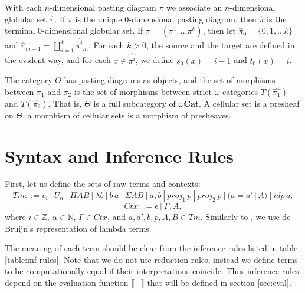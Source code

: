 \documentclass{amsart}
\theoremstyle{definition}
\theoremstyle{remark}
\newcommand{\cat}[1]{\mathbf{#1}}
\newcommand{\nats}{\mathbb{N}}
\newcommand{\Z}{\mathbb{Z}}
\newcommand{\ocat}{\omega \cat{Cat}}
\numberwithin{table}{section}
\begin{document}
With each $n$-dimensional pasting diagram $\pi$ we associate an $n$-dimensional globular set $\widehat{\pi}$.
If $\pi$ is the unique $0$-dimensional pasting diagram, then $\widehat{\pi}$ is the terminal $0$-dimensional globular set.
If $\pi = (\pi^1, \ldots \pi^k)$, then let $\widehat{\pi}_0 = \{0, 1, \ldots k\}$
and $\widehat{\pi}_{m+1} = \coprod \limits_{i = 1}^k \widehat{\pi^i}_m$.
For each $k > 0$, the source and the target are defined in the evident way,
and for each $x \in \widehat{\pi^i}$, we define $s_0(x) = i - 1$ and $t_0(x) = i$.

\begin{defn}
The category $\Theta$ has pasting diagrams as objects, and the set of morphisms between $\pi_1$ and $\pi_2$
is the set of morphisms between strict $\omega$-categories $T(\widehat{\pi_1})$ and $T(\widehat{\pi_2})$.
That is, $\Theta$ is a full subcategory of $\ocat$.
A cellular set is a presheaf on $\Theta$, a morphism of cellular sets is a morphism of presheaves.
\end{defn}

\section{Syntax and Inference Rules}

First, let us define the sets of raw terms and contexts:
\[ Tm ::= v_i\ |\ U_\alpha\ |\ \Pi A B\ |\ \lambda b\ |\ b\,a\ |\ \Sigma A B\ |\ a , b\ |\ proj_1\,p\ |\ proj_2\,p\ |\ (a = a'\,|\,A)\ |\ idp\,a, \]
\[ Ctx ::= \epsilon\ |\ \Gamma, A, \]
where $i \in \Z$, $\alpha \in \nats$, $\Gamma \in Ctx$, and $a, a', b, p, A, B \in Tm$.
Similarly to \cite{norm}, we use de Bruijn's representation of lambda terms.

The meaning of each term should be clear from the inference rules listed in table \ref{table:inf-rules}.
Note that we do not use reduction rules, instead we define terms to be computationally equal if their interpretations coincide.
Thus inference rules depend on the evaluation function $\llbracket - \rrbracket$ that will be defined in section \ref{sec:eval}.

\centerAlignProof
\end{document}
